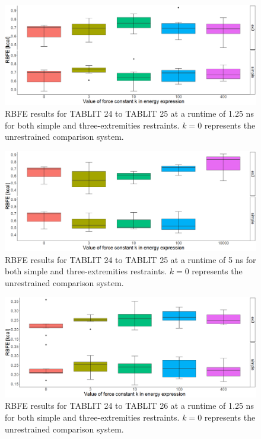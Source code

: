 \documentclass[oneside]{scrreprt}
\begin{document}
\begin{figure}[h]
    \centering
    \includegraphics[width=1\textwidth]{plots/boxplot_rbfe_tablit24to25_1.25ns.png}
    \caption[RBFE results for TABLIT 24 to 25 (1.25ns)]{RBFE results for TABLIT 24 to TABLIT 25 at a runtime of 1.25 ns for both simple and three-extremities restraints. $k=0$ represents the unrestrained comparison system.}
    
\end{figure}

\begin{figure}[h]
    \centering
    \includegraphics[width=1\textwidth]{plots/boxplot_rbfe_tablit24to25_5ns.png}
    \caption[RBFE results for TABLIT 24 to 25 (5ns)]{RBFE results for TABLIT 24 to TABLIT 25 at a runtime of 5 ns for both simple and three-extremities restraints. $k=0$ represents the unrestrained comparison system.}
    
\end{figure}

\begin{figure}[h]
    \centering
    \includegraphics[width=1\textwidth]{plots/boxplot_rbfe_tablit24to26_1.25ns.png}
    \caption[RBFE results for TABLIT 24 to 26 (1.25ns)]{RBFE results for TABLIT 24 to TABLIT 26 at a runtime of 1.25 ns for both simple and three-extremities restraints. $k=0$ represents the unrestrained comparison system.}
    
\end{figure}
\end{document}
